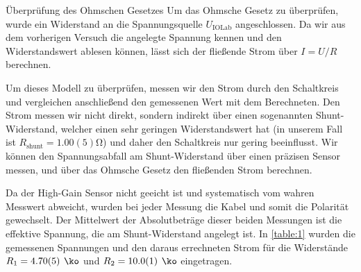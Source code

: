 \documentclass{alex_gp}
\begin{document}
\begin{mybox}{Überprüfung des Ohmschen Gesetzes}
	Um das Ohmsche Gesetz zu überprüfen, wurde ein Widerstand an die Spannungsquelle \( U_{\text{IOLab}} \) angeschlossen. Da wir aus dem vorherigen Versuch die angelegte Spannung kennen und den Widerstandswert ablesen können, lässt sich der fließende Strom über \( I = U/R \) berechnen.
	
	Um dieses Modell zu überprüfen, messen wir den Strom durch den Schaltkreis und vergleichen anschließend den gemessenen Wert mit dem Berechneten. Den Strom messen wir nicht direkt, sondern indirekt über einen sogenannten Shunt-Widerstand, welcher einen sehr geringen Widerstandswert hat (in unserem Fall ist \( R_{\text{shunt}} = 1.00(5) \unit{\ohm} \)) und daher den Schaltkreis nur gering beeinflusst. Wir können den Spannungsabfall am Shunt-Widerstand über einen präzisen Sensor messen, und über das Ohmsche Gesetz den fließenden Strom berechnen. 
	
	Da der High-Gain Sensor nicht geeicht ist und systematisch vom wahren Messwert abweicht, wurden bei jeder Messung die Kabel und somit die Polarität gewechselt. Der Mittelwert der Absolutbeträge dieser beiden Messungen ist die effektive Spannung, die am Shunt-Widerstand angelegt ist. In \autoref{table:1} wurden die gemessenen Spannungen und den daraus errechneten Strom für die Widerstände \( R_1 = 4.70(5) \unit{\ko} \) und \( R_2 = 10.0(1) \unit{\ko} \) eingetragen.
	

\end{mybox}
\end{document}
